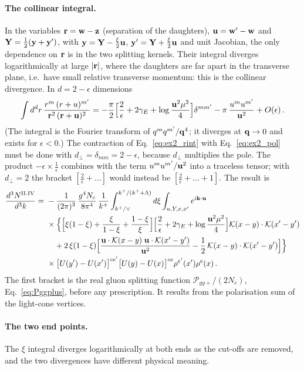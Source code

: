 \paragraph{The collinear integral.} In the variables $\mathbf{r}=\mathbf{w}-\mathbf{z}$ (separation of the daughters), $\mathbf{u}=\mathbf{w}'-\mathbf{w}$ and $\mathbf{Y}=\frac12(\mathbf{y}+\mathbf{y}')$, with $\mathbf{y}=\mathbf{Y}-\frac\xi2\mathbf{u}$, $\mathbf{y}'=\mathbf{Y}+\frac\xi2\mathbf{u}$ and unit Jacobian, the only dependence on $\mathbf{r}$ is in the two splitting kernels. Their integral diverges logarithmically at large $|\mathbf{r}|$, where the daughters are far apart in the transverse plane, i.e.\ have small relative transverse momentum: this is the collinear divergence. In $d=2-\epsilon$ dimensions
\begin{align}\label{eq:ex2_rint}
\int d^dr\,\frac{r^m\,(r+u)^{m'}}{\mathbf{r}^2\,(\mathbf{r}+\mathbf{u})^2}
=-\frac\pi2\Big[\frac2\epsilon+2\gamma_E+\log\frac{\mathbf{u}^2\mu^2}{4}\Big]\delta^{mm'}-\pi\,\frac{u^mu^{m'}}{\mathbf{u}^2}+O(\epsilon)\,.
\end{align}
(The integral is the Fourier transform of $q^mq^{m'}/\mathbf{q}^4$; it diverges at $\mathbf{q}\to0$ and exists for $\epsilon<0$.) The contraction of Eq.~\eqref{eq:ex2_rint} with Eq.~\eqref{eq:ex2_pol} must be done with $d_\perp=\delta_{mm}=2-\epsilon$, because $d_\perp$ multiplies the pole. The product $-\epsilon\times\frac1\epsilon$ combines with the term $u^mu^{m'}/\mathbf{u}^2$ into a traceless tensor; with $d_\perp=2$ the bracket $[\frac2\epsilon+\dots]$ would instead be $[\frac2\epsilon+\dots+1]$. The result is
\begin{align}\label{eq:ex2_contr}
\frac{d^3N^{\rm II.IV}}{d^3k}=\ &-\frac{1}{(2\pi)^3}\,\frac{g^4N_c}{8\pi^4}\,\frac{1}{k^+}\int_{k^+/\vee}^{k^+/(k^++\Lambda)}d\xi\int_{u,Y,x,x'}e^{i\v k\cdot\v u}\notag\\
&\times\Big\{\Big[\xi(1-\xi)+\frac{\xi}{1-\xi}+\frac{1-\xi}{\xi}\Big]\Big[\frac2\epsilon+2\gamma_E+\log\frac{\v u^2\mu^2}{4}\Big]\Kv(x-y)\cdot\Kv(x'-y')\notag\\
&\quad+2\,\xi(1-\xi)\Big[\frac{\v u\cdot\Kv(x-y)\;\v u\cdot\Kv(x'-y')}{\v u^2}-\frac12\,\Kv(x-y)\cdot\Kv(x'-y')\Big]\Big\}\notag\\
&\times\big[U(y')-U(x')\big]^{ce'}\big[U(y)-U(x)\big]^{ce}\rho^{e'}(x')\rho^e(x)\,.
\end{align}
The first bracket is the real gluon splitting function $\mathcal P_{gg+}/(2N_c)$, Eq.~\eqref{eq:Pggplus}, before any prescription. It results from the polarisation sum of the light-cone vertices.

\paragraph{The two end points.} The $\xi$ integral diverges logarithmically at both ends as the cut-offs are removed, and the two divergences have different physical meaning.

